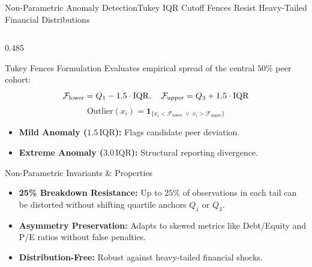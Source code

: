 \begin{frame}{Non-Parametric Anomaly Detection}{Tukey IQR Cutoff Fences Resist Heavy-Tailed Financial Distributions}
\begin{columns}[T,onlytextwidth]
        \begin{column}{0.485\textwidth}
            \begin{mathcard}[height=2.74cm]{Tukey Fences Formulation}
                \fontsize{5.7pt}{6.9pt}\selectfont
                Evaluates empirical spread of the central $50\%$ peer cohort:
                \begin{equation*}
                    \textstyle \mathcal{F}_{\text{lower}} = Q_1 - 1.5 \cdot \operatorname{IQR}, \quad \mathcal{F}_{\text{upper}} = Q_3 + 1.5 \cdot \operatorname{IQR}
                \end{equation*}
                \begin{equation*}
                    \textstyle \text{Outlier}(x_i) = \mathbf{1}_{\{x_i < \mathcal{F}_{\text{lower}} \;\lor\; x_i > \mathcal{F}_{\text{upper}}\}}
                \end{equation*}
                \begin{itemize}
                    \setlength{\itemsep}{1.2pt}
                    \item \textbf{Mild Anomaly ($1.5\,\text{IQR}$):} Flags candidate peer deviation.
                    \item \textbf{Extreme Anomaly ($3.0\,\text{IQR}$):} Structural reporting divergence.
                \end{itemize}
            \end{mathcard}

            \vspace{0.12cm}

            \begin{quantcard}[height=2.74cm]{Non-Parametric Invariants \& Properties}
                \fontsize{5.8pt}{7.0pt}\selectfont
                \begin{itemize}
                    \setlength{\itemsep}{1.5pt}
                    \item \textbf{25\% Breakdown Resistance:} Up to $25\%$ of observations in each tail can be distorted without shifting quartile anchors $Q_1$ or $Q_3$.
                    \item \textbf{Asymmetry Preservation:} Adapts to skewed metrics like Debt/Equity and P/E ratios without false penalties.
                    \item \textbf{Distribution-Free:} Robust against heavy-tailed financial shocks.
                \end{itemize}
            \end{quantcard}
        \end{column}
    \end{columns}
\end{frame}
